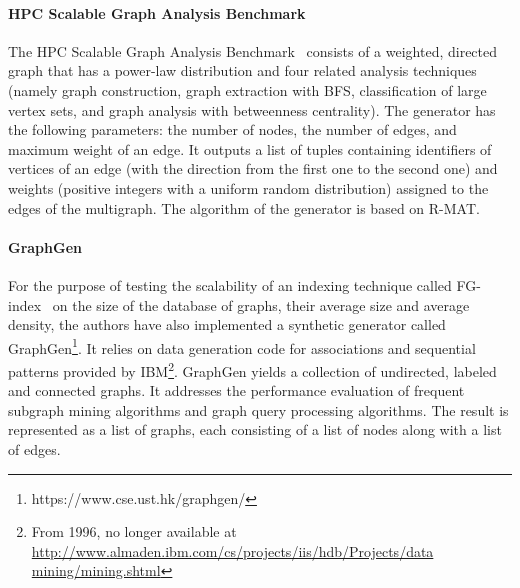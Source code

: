 \paragraph{HPC Scalable Graph Analysis Benchmark} The HPC Scalable Graph
Analysis Benchmark~\cite{HPCgraph,Bader:2005:DIH:2099301.2099360} consists of a
weighted, directed graph that has a power-law distribution and four related
analysis techniques (namely graph construction, graph extraction with BFS,
                     classification of large vertex sets, and graph analysis
                     with betweenness centrality). The generator has the
following parameters: the number of nodes, the number of edges, and maximum weight of
an edge. It outputs a list of tuples containing identifiers of vertices of an
edge (with the direction from the first one to the second one) and weights
(positive integers  with a uniform random distribution) assigned to the edges of
the multigraph.  The algorithm of the generator is based on R-MAT. 



\paragraph{GraphGen} For the purpose of testing the scalability of an indexing
technique called FG-index~\cite{Cheng:2007:FTV:1247480.1247574} on the size of the
database of graphs, their average size and average density, the authors have
also implemented a synthetic generator called
GraphGen\footnote{https://www.cse.ust.hk/graphgen/}. It relies on data generation code for associations and sequential
patterns provided by IBM\footnote{From 1996, no longer available at
\url{http://www.almaden.ibm.com/cs/projects/iis/hdb/Projects/data
mining/mining.shtml}}. GraphGen yields a collection of undirected, labeled and
connected graphs. It addresses the performance evaluation of frequent subgraph mining
algorithms and graph query processing algorithms. The result is represented as a
list of graphs, each consisting of a list of nodes along with a list of edges.


